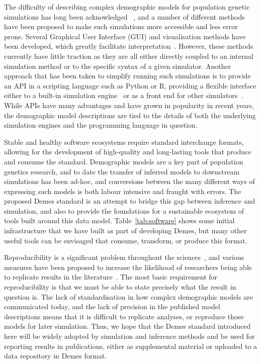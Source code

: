\documentclass[11pt]{article}
\begin{document}
The difficulty of describing complex demographic models
for population genetic simulations has long been acknowledged
~\citep[e.g.,][]{antao2007modeler4simcoal2}, %
and a number of different methods have been proposed to
make such simulations more accessible and less error prone.
Several Graphical User Interface (GUI) and visualisation
methods have been developed, which greatly facilitate
interpretation~\citep{mailund2005coasim,antao2007modeler4simcoal2,
ewing2010msms,zhou2018popdemog}. However, these methods
currently have little traction as they are all either directly coupled
to an internal simulation method or to the specific syntax
of a given simulator. Another approach that has been taken to
simplify running such simulations is to provide an API in a
scripting language such as Python or R, providing a flexible
interface either to a built-in simulation
engine~\citep{thornton2014cpp,thornton2019-nu,baumdicker2021-iu,
kelleher2016efficient,haller2017flexible}
or as a front end for other simulators~\citep{staab2016coala}.
While APIs have many advantages and have grown in popularity in
recent years, the demographic model descriptions are tied
to the details of both the underlying simulation engines
and the programming language in question.

Stable and healthy software ecosystems require standard interchange
formats, allowing for the development of high-quality and long-lasting
tools that produce and consume the standard.
Demographic models are a key part of population genetics research,
and to date the transfer of inferred models to downstream simulations
has been ad-hoc, and conversions between the many different ways
of expressing such models is both labour intensive and fraught with errors.
The proposed Demes standard is an attempt to bridge this gap
between inference and simulation, and also to provide the foundations
for a sustainable ecosystem of tools built around this data model.
Table~\ref{tab:software} shows some initial infrastructure that we have
built as part of developing Demes, but many other useful tools
can be envisaged that consume, transform, or produce this format.

Reproducibility is a significant problem throughout the
sciences~\citep{baker20161}, and various measures have been
proposed to increase the likelihood of researchers being
able to replicate results in the
literature~\citep{munafo2017manifesto}. The most basic requirement
for reproducibility is that we must be able to state precisely what
the result in question is. The lack of standardisation in how
complex demographic models are communicated today, and the lack of
precision in the published model descriptions means that it is difficult
to replicate analyses, or reproduce those models for later simulation.
Thus, we hope that the Demes standard introduced here will be widely adopted
by simulation and inference methods and be used for reporting results in
publications, either as supplemental material or uploaded to a data
repository in Demes format.
\end{document}
